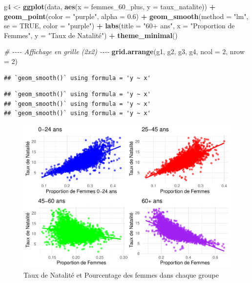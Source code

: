 \documentclass[
]{article}
\newenvironment{Shaded}{\begin{snugshade}}{\end{snugshade}}
\newcommand{\AttributeTok}[1]{\textcolor[rgb]{0.13,0.29,0.53}{#1}}
\newcommand{\CommentTok}[1]{\textcolor[rgb]{0.56,0.35,0.01}{\textit{#1}}}
\newcommand{\ConstantTok}[1]{\textcolor[rgb]{0.56,0.35,0.01}{#1}}
\newcommand{\DecValTok}[1]{\textcolor[rgb]{0.00,0.00,0.81}{#1}}
\newcommand{\FloatTok}[1]{\textcolor[rgb]{0.00,0.00,0.81}{#1}}
\newcommand{\FunctionTok}[1]{\textcolor[rgb]{0.13,0.29,0.53}{\textbf{#1}}}
\newcommand{\NormalTok}[1]{#1}
\newcommand{\OtherTok}[1]{\textcolor[rgb]{0.56,0.35,0.01}{#1}}
\newcommand{\SpecialCharTok}[1]{\textcolor[rgb]{0.81,0.36,0.00}{\textbf{#1}}}
\newcommand{\StringTok}[1]{\textcolor[rgb]{0.31,0.60,0.02}{#1}}
\begin{document}
\begin{Shaded}
\begin{Highlighting}[]
\NormalTok{g4 }\OtherTok{\textless{}{-}} \FunctionTok{ggplot}\NormalTok{(data, }\FunctionTok{aes}\NormalTok{(}\AttributeTok{x =}\NormalTok{ femmes\_60\_plus, }\AttributeTok{y =}\NormalTok{ taux\_natalite)) }\SpecialCharTok{+}
  \FunctionTok{geom\_point}\NormalTok{(}\AttributeTok{color =} \StringTok{"purple"}\NormalTok{, }\AttributeTok{alpha =} \FloatTok{0.6}\NormalTok{) }\SpecialCharTok{+}
  \FunctionTok{geom\_smooth}\NormalTok{(}\AttributeTok{method =} \StringTok{"lm"}\NormalTok{, }\AttributeTok{se =} \ConstantTok{TRUE}\NormalTok{, }\AttributeTok{color =} \StringTok{"purple"}\NormalTok{) }\SpecialCharTok{+}
  \FunctionTok{labs}\NormalTok{(}\AttributeTok{title =} \StringTok{"60+ ans"}\NormalTok{,}
       \AttributeTok{x =} \StringTok{"Proportion de Femmes"}\NormalTok{,}
       \AttributeTok{y =} \StringTok{"Taux de Natalité"}\NormalTok{) }\SpecialCharTok{+}
  \FunctionTok{theme\_minimal}\NormalTok{()}

\CommentTok{\# {-}{-}{-}{-}  Affichage en grille (2x2) {-}{-}{-}{-}}
\FunctionTok{grid.arrange}\NormalTok{(g1, g2, g3, g4, }\AttributeTok{ncol =} \DecValTok{2}\NormalTok{, }\AttributeTok{nrow =} \DecValTok{2}\NormalTok{)}
\end{Highlighting}
\end{Shaded}

\begin{verbatim}
## `geom_smooth()` using formula = 'y ~ x'
\end{verbatim}

\begin{verbatim}
## `geom_smooth()` using formula = 'y ~ x'
## `geom_smooth()` using formula = 'y ~ x'
## `geom_smooth()` using formula = 'y ~ x'
\end{verbatim}

\begin{figure}

{\centering \includegraphics{4_Analyse_Descriptive_files/figure-latex/unnamed-chunk-5-1} 

}

\caption{Taux de Natalité et Pourcentage des femmes dans chaque groupe}\label{fig:unnamed-chunk-5}
\end{figure}
\end{document}
